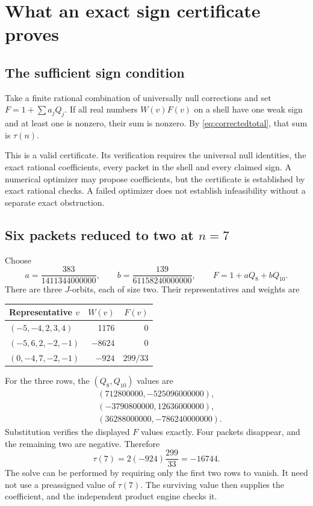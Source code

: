\chapter{What an exact sign certificate proves}\label{ch:certificates}
\section{The sufficient sign condition}
Take a finite rational combination of universally null corrections and set $F=1+\sum a_jQ_j$. If all real numbers $W(v)F(v)$ on a shell have one weak sign and at least one is nonzero, their sum is nonzero. By \eqref{eq:correctedtotal}, that sum is $\tau(n)$.

This is a valid certificate. Its verification requires the universal null identities, the exact rational coefficients, every packet in the shell and every claimed sign. A numerical optimizer may propose coefficients, but the certificate is established by exact rational checks. A failed optimizer does not establish infeasibility without a separate exact obstruction.

\section{Six packets reduced to two at \texorpdfstring{$n=7$}{n=7}}
Choose
\[
a=\frac{383}{1411344000000},\qquad
b=\frac{139}{61158240000000},\qquad
F=1+aQ_8+bQ_{10}.
\]
There are three $J$-orbits, each of size two. Their representatives and weights are
\begin{center}
\begin{tabular}{lrr}
\toprule
Representative $v$&$W(v)$&$F(v)$\\
\midrule
$(-5,-4,2,3,4)$&1176&0\\
$(-5,6,2,-2,-1)$&$-8624$&0\\
$(0,-4,7,-2,-1)$&$-924$&$299/33$\\
\bottomrule
\end{tabular}
\end{center}
For the three rows, the $(Q_8,Q_{10})$ values are
\begin{align*}
&(712800000,-525096000000),\\
&(-3790800000,12636000000),\\
&(36288000000,-786240000000).
\end{align*}
Substitution verifies the displayed $F$ values exactly. Four packets disappear, and the remaining two are negative. Therefore
\begin{equation}\label{eq:tau7cert}
\tau(7)=2(-924)\frac{299}{33}=-16744.
\end{equation}
The solve can be performed by requiring only the first two rows to vanish. It need not use a preassigned value of $\tau(7)$. The surviving value then supplies the coefficient, and the independent product engine checks it.


